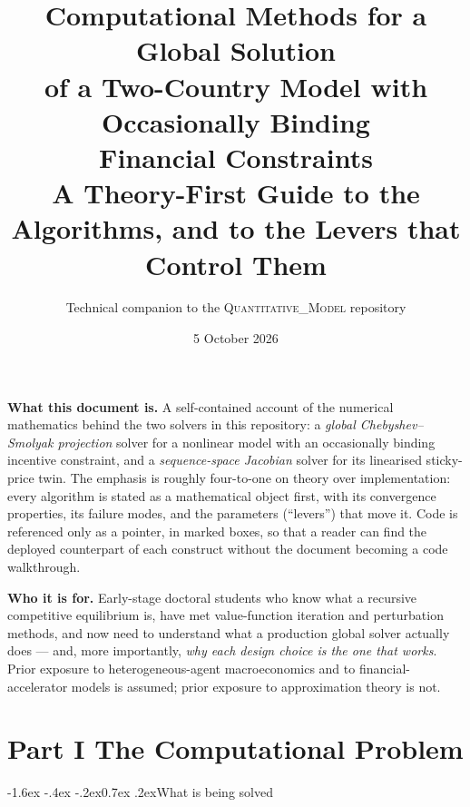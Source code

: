 \documentclass[10pt,a4paper]{article}
\title{\vspace{-2.2em}\textbf{Computational Methods for a Global Solution\\of a Two-Country Model with
Occasionally Binding\\Financial Constraints}\\[0.6em]
\large A Theory-First Guide to the Algorithms, and to the Levers that Control Them}
\author{Technical companion to the \textsc{Quantitative\_Model} repository}
\date{5 October 2026}
\makeatletter
\theoremstyle{definition}
\theoremstyle{plain}
\theoremstyle{remark}
\renewcommand\section{\@startsection{section}{1}{\z@}%
  {-1.6ex \@plus -.4ex \@minus -.2ex}{0.7ex \@plus.2ex}{\normalfont\large\bfseries}}
\makeatother
\begin{document}
\maketitle
\thispagestyle{empty}

\begin{center}
\begin{minipage}{0.88\textwidth}
\small
\noindent\textbf{What this document is.} A self-contained account of the numerical mathematics
behind the two solvers in this repository: a \emph{global Chebyshev--Smolyak projection}
solver for a nonlinear model with an occasionally binding incentive constraint, and a
\emph{sequence-space Jacobian} solver for its linearised sticky-price twin. The emphasis is
roughly four-to-one on theory over implementation: every algorithm is stated as a
mathematical object first, with its convergence properties, its failure modes, and the
parameters (``levers'') that move it. Code is referenced only as a pointer, in marked
boxes, so that a reader can find the deployed counterpart of each construct without the
document becoming a code walkthrough.

\medskip
\noindent\textbf{Who it is for.} Early-stage doctoral students who know what a recursive
competitive equilibrium is, have met value-function iteration and perturbation methods, and
now need to understand what a production global solver actually does --- and, more
importantly, \emph{why each design choice is the one that works}. Prior exposure to
heterogeneous-agent macroeconomics and to financial-accelerator models is assumed; prior
exposure to approximation theory is not.
\end{minipage}
\end{center}
\vspace{0.4em}\setcounter{tocdepth}{1}{\footnotesize\tableofcontents}

\vspace{-4pt}\part*{Part I \quad The Computational Problem}
\section{What is being solved}
\end{document}
